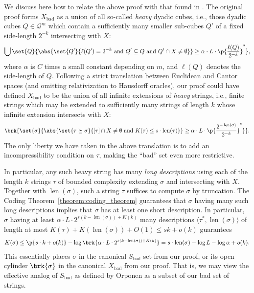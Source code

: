 We discuss here how to relate the above proof with that found in \cite{Orp21}. The original proof forms $X_{\operatorname{bad}}$ as a union of all so-called \textit{heavy} dyadic cubes, i.e., those dyadic cubes $Q \in \mathcal{Q}^m$ which contain a sufficiently many smaller sub-cubes $Q'$ of a fixed side-length $2^{-k}$ intersecting with $X$:
\begin{align*}
    \bigcup \set{Q}{\abs{\set{Q'}{\ell(Q') = 2^{-k} \text{ and }  Q' \subseteq Q \text{ and }  Q' \cap X \neq \emptyset}} \geq \alpha \cdot L \cdot \p{\frac{\ell(Q)}{2^{-k}}}^s},
\end{align*}
where $\alpha$ is $C$ times a small constant depending on $m$, and $\ell(Q)$ denotes the side-length of $Q$. Following a strict translation between Euclidean and Cantor spaces (and omitting relativization to Hausdorff oracles), our proof could have defined $X_{\operatorname{bad}}$ to be the union of all infinite extensions of \textit{heavy} strings, i.e., finite strings which may be extended to sufficiently many strings of length $k$ whose infinite extension intersects with $X$:
\begin{align*}
    \brk{\set{\sigma}{\abs{\set{\tau \succeq \sigma}{[\tau] \cap X \neq \emptyset \text{ and } K(\tau) \leq s \cdot \operatorname{len}(\tau)}} \geq \alpha \cdot L \cdot \p{\frac{2^{-\operatorname{len}(\sigma)}}{2^{-k}}}^s}}.
\end{align*}
The only liberty we have taken in the above translation is to add an incompressibility condition on $\tau$, making the ``bad'' set even more restrictive. 

In particular, any such heavy string has many \textit{long descriptions} using each of the length $k$ strings $\tau$ of bounded complexity extending $\sigma$ and intersecting with $X$. Together with $\operatorname{len}(\sigma)$, such a string $\tau$ suffices to compute $\sigma$ by truncation. The Coding Theorem~\ref{theorem:coding_theorem} guarantees that $\sigma$ having many such long descriptions implies that $\sigma$ has at least one short description. In particular, $\sigma$ having at least $\alpha \cdot L \cdot 2^{s(k - \operatorname{len}(\sigma)) + K(k)}$ many descriptions $\langle\tau^*, \operatorname{len}(\sigma) \rangle$ of length at most $K(\tau) + K(\operatorname{len}(\sigma)) + O(1) \leq sk + o(k)$ guarantees 
\begin{align*}
    K(\sigma) \leq \p{s \cdot k + o(k)} - \log \brk{\alpha \cdot L \cdot 2^{s(k - \operatorname{len}(\sigma)) + K(k)}} = s \cdot \operatorname{len}(\sigma) - \log L - \log \alpha + o(k).
\end{align*}
This essentially places $\sigma$ in the canonical $S_{\operatorname{bad}}$ set from our proof, or its open cylinder $\brk{\sigma}$ in the canonical $X_{\operatorname{bad}}$ from our proof. That is, we may view the effective analog of $S_{\operatorname{bad}}$ as defined by Orponen as a subset of our bad set of strings.


